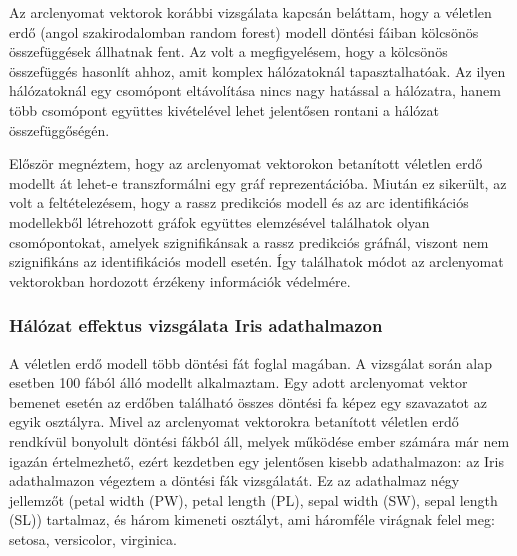 Az arclenyomat vektorok korábbi vizsgálata kapcsán beláttam, hogy a véletlen erdő (angol szakirodalomban random forest) modell döntési fáiban kölcsönös összefüggések állhatnak fent. Az volt a megfigyelésem, hogy a kölcsönös összefüggés hasonlít ahhoz, amit komplex hálózatoknál tapasztalhatóak. Az ilyen hálózatoknál egy csomópont eltávolítása nincs nagy hatással a hálózatra, hanem több csomópont együttes kivételével lehet jelentősen rontani a hálózat összefüggőségén. 

Először megnéztem, hogy az arclenyomat vektorokon betanított véletlen erdő modellt át lehet-e transzformálni egy gráf reprezentációba. Miután ez sikerült, az volt a feltételezésem, hogy a rassz predikciós modell és az arc identifikációs modellekből létrehozott gráfok együttes elemzésével találhatok olyan csomópontokat, amelyek szignifikánsak a rassz predikciós gráfnál, viszont nem szignifikáns az identifikációs modell esetén. Így találhatok módot az arclenyomat vektorokban hordozott érzékeny információk védelmére. 

\subsubsection*{Hálózat effektus vizsgálata Iris adathalmazon}
A véletlen erdő modell több döntési fát foglal magában. A vizsgálat során alap esetben 100 fából álló modellt alkalmaztam. Egy adott arclenyomat vektor bemenet esetén az erdőben található összes döntési fa képez egy szavazatot az egyik osztályra. Mivel az arclenyomat vektorokra betanított véletlen erdő rendkívül bonyolult döntési fákból áll, melyek működése ember számára már nem igazán értelmezhető, ezért kezdetben egy jelentősen kisebb adathalmazon: az Iris adathalmazon \cite{iris1936} végeztem a döntési fák vizsgálatát. Ez az adathalmaz négy jellemzőt (petal width (PW), petal length (PL), sepal width (SW), sepal length (SL)) tartalmaz, és három kimeneti osztályt, ami háromféle virágnak felel meg: setosa, versicolor, virginica. 

